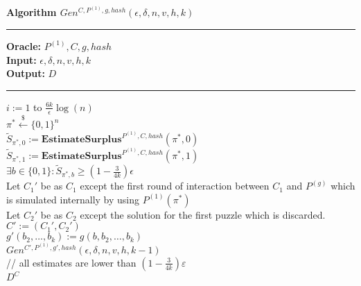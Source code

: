 \begin{codeblock}
  \textbf{Algorithm $Gen^{C,P^{(1)},g,hash}(\epsilon, \delta, n, v, h, k)$}
  \medskip
  \hrule
  \medskip
  \textbf{Oracle:} $ P^{(1)}, C, g, hash$ \\
  \textbf{Input:}  $\epsilon, \delta, n, v, h, k$\\
  \textbf{Output:} $D$
  \medskip\hrule\medskip
  \For $i:=1$ to $\frac{6k}{\epsilon}\log(n)$ \Do \\
  \IndI $\pi^* \xleftarrow{\$} \{0,1\}^{n}$\\
  \IndI $\widetilde{S}_{\pi^*,0} := \textbf{EstimateSurplus}^{P^{(1)}, C, hash}(\pi^*, 0)$\\
  \IndI $\widetilde{S}_{\pi^*,1} := \textbf{EstimateSurplus}^{P^{(1)}, C, hash}(\pi^*, 1)$\\
  \IndI \If $ \exists b \in \{0,1\}: \widetilde{S}_{\pi^*,b} \geq (1 - \frac{3}{4k}) \epsilon$ \then \\
  \IndII Let $C_1'$ be as $C_1$ except the first round of interaction between $C_1$ and $P^{(g)}$ which \\
  \IndII is simulated internally by using $P^{(1)}(\pi^*)$\\
  \IndII Let $C_2'$ be as $C_2$ except the solution for the first puzzle which is discarded. \\
  \IndII $C' := (C_1', C_2')$ \\
  \IndII $g'(b_2, \dots, b_k) := g(b, b_2, \dots, b_k)$\\
  \IndII\return $Gen^{C', P^{(1)}, g', hash}(\epsilon, \delta, n, v, h, k-1)$ \\
  // all estimates are lower than $(1-\frac{3}{4k})\varepsilon$\\
  \return $D^{C}$
\end{codeblock}

